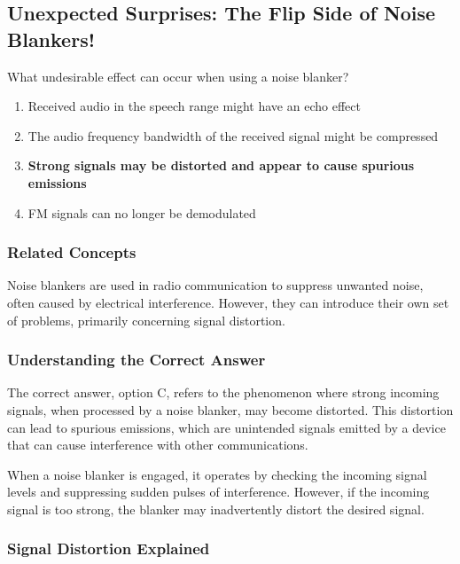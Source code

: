 \subsection{Unexpected Surprises: The Flip Side of Noise Blankers!}

\begin{tcolorbox}[colback=gray!10, colframe=black, title=E4E09`]
What undesirable effect can occur when using a noise blanker? 

\begin{enumerate}[label=\Alph*.]
    \item Received audio in the speech range might have an echo effect
    \item The audio frequency bandwidth of the received signal might be compressed
    \item \textbf{Strong signals may be distorted and appear to cause spurious emissions}
    \item FM signals can no longer be demodulated
\end{enumerate} \end{tcolorbox}

\subsubsection{Related Concepts}

Noise blankers are used in radio communication to suppress unwanted noise, often caused by electrical interference. However, they can introduce their own set of problems, primarily concerning signal distortion. 

\subsubsection{Understanding the Correct Answer}

The correct answer, option C, refers to the phenomenon where strong incoming signals, when processed by a noise blanker, may become distorted. This distortion can lead to spurious emissions, which are unintended signals emitted by a device that can cause interference with other communications.

When a noise blanker is engaged, it operates by checking the incoming signal levels and suppressing sudden pulses of interference. However, if the incoming signal is too strong, the blanker may inadvertently distort the desired signal. 

\subsubsection{Signal Distortion Explained}

